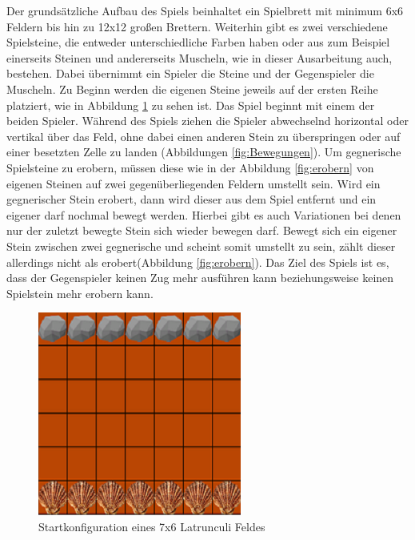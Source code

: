 Der grundsätzliche Aufbau des Spiels beinhaltet ein Spielbrett mit minimum 6x6 Feldern bis hin zu 12x12 großen Brettern. Weiterhin gibt es zwei verschiedene Spielsteine, die entweder unterschiedliche Farben haben oder aus zum Beispiel einerseits Steinen und andererseits Muscheln, wie in dieser Ausarbeitung auch, bestehen. Dabei übernimmt ein Spieler die Steine und der Gegenspieler die Muscheln. Zu Beginn werden die eigenen Steine jeweils auf der ersten Reihe platziert, wie in Abbildung \ref{fig:startzustand} zu sehen ist. Das Spiel beginnt mit einem der beiden Spieler. Während des Spiels ziehen die Spieler abwechselnd horizontal oder vertikal über das Feld, ohne dabei einen anderen Stein zu überspringen oder auf einer besetzten Zelle zu landen (Abbildungen \ref{fig:Bewegungen}). Um gegnerische Spielsteine zu erobern, müssen diese wie in der Abbildung \ref{fig:erobern} von eigenen Steinen auf zwei gegenüberliegenden Feldern umstellt sein. Wird ein gegnerischer Stein erobert, dann wird dieser aus dem Spiel entfernt und ein eigener darf nochmal bewegt werden. Hierbei gibt es auch Variationen bei denen nur der zuletzt bewegte Stein sich wieder bewegen darf.
Bewegt sich ein eigener Stein zwischen zwei gegnerische und scheint somit umstellt zu sein, zählt dieser allerdings nicht als erobert(Abbildung \ref{fig:erobern}).
Das Ziel des Spiels ist es, dass der Gegenspieler keinen Zug mehr ausführen kann beziehungsweise keinen Spielstein mehr erobern kann.
\begin{figure}[h]
\centering
\includegraphics{img/regeln_startzustand22}
\caption{Startkonfiguration eines 7x6 Latrunculi Feldes}
\label{fig:startzustand}
\end{figure}
